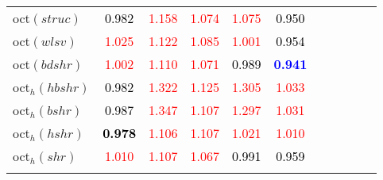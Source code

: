 \begin{tabular}[t]{l|>{}cccc>{}c|ccccc}
oct$(struc)$ & \textcolor{black}{0.982} & \textcolor{red}{1.158} & \textcolor{red}{1.074} & \textcolor{red}{1.075} & \textcolor{black}{0.950} &  &  &  &  & \\
oct$(wlsv)$ & \textcolor{red}{1.025} & \textcolor{red}{1.122} & \textcolor{red}{1.085} & \textcolor{red}{1.001} & \textcolor{black}{0.954} &  &  &  &  & \\
oct$(bdshr)$ & \textcolor{red}{1.002} & \textcolor{red}{1.110} & \textcolor{red}{1.071} & \textcolor{black}{0.989} & \textcolor{blue}{\textbf{0.941}} &  &  &  &  & \\
oct$_h(hbshr)$ & \textcolor{black}{0.982} & \textcolor{red}{1.322} & \textcolor{red}{1.125} & \textcolor{red}{1.305} & \textcolor{red}{1.033} &  &  &  &  & \\
oct$_h(bshr)$ & \textcolor{black}{0.987} & \textcolor{red}{1.347} & \textcolor{red}{1.107} & \textcolor{red}{1.297} & \textcolor{red}{1.031} &  &  &  &  & \\
oct$_h(hshr)$ & \textcolor{black}{\textbf{0.978}} & \textcolor{red}{1.106} & \textcolor{red}{1.107} & \textcolor{red}{1.021} & \textcolor{red}{1.010} &  &  &  &  & \\
oct$_h(shr)$ & \textcolor{red}{1.010} & \textcolor{red}{1.107} & \textcolor{red}{1.067} & \textcolor{black}{0.991} & \textcolor{black}{0.959} &  &  &  &  & \\
\bottomrule
{}\\
\end{tabular}
